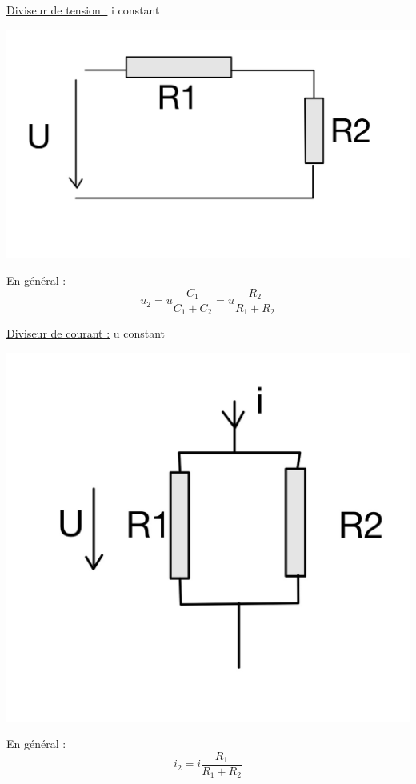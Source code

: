 \documentclass[../main.tex]{subfiles}
\begin{document}
\quad \underline{Diviseur de tension :} i constant\\
\begin{minipage}{.5\textwidth}
    \includegraphics[width=.8\textwidth]{IMAGES/elec/divtens.jpeg}
    
\end{minipage}
\hfill
\begin{minipage}{.5\textwidth}
    En général : 
    \begin{equation}
        u_2 = u\frac{C_1}{C_1+C_2} = u\frac{R_2}{R_1+R_2}
    \end{equation}
\end{minipage}

\quad \underline{Diviseur de courant :} u constant\\
\begin{minipage}{.5\textwidth}
    \includegraphics[width=.8\textwidth]{IMAGES/elec/divcour.jpeg}
    
\end{minipage}
\hfill
\begin{minipage}{.5\textwidth}
    En général : 
    \begin{equation}
        i_2 = i\frac{R_1}{R_1+R_2}
    \end{equation}
\end{minipage}
\end{document}
